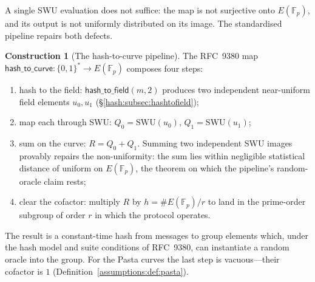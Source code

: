 \documentclass[11pt,a4paper]{article}
\theoremstyle{definition}
\newtheorem{construction}[theorem]{Construction}
\theoremstyle{remark}
\newcommand{\Fp}{\ensuremath{\mathbb{F}_{p}}}
\begin{document}
A single SWU evaluation does not suffice: the map is not surjective
onto \(E(\Fp)\), and its output is not uniformly distributed on its
image. The standardised pipeline repairs both defects.

\begin{construction}[The hash-to-curve pipeline]\label{hash:con:h2c}
The RFC~9380 map
\(\mathsf{hash\_to\_curve} \colon \allowbreak \{0,1\}^{*} \to E(\Fp)\) composes
four steps:
\begin{enumerate}
\item hash to the field: \(\mathsf{hash\_to\_field}(m, 2)\) produces
  two independent near-uniform field elements \(u_{0}, u_{1}\)
  (\S\ref{hash:subsec:hashtofield});
\item map each through SWU: \(Q_{0} = \mathrm{SWU}(u_{0})\),
  \(Q_{1} = \mathrm{SWU}(u_{1})\);
\item sum on the curve: \(R = Q_{0} + Q_{1}\). Summing two
  independent SWU images provably repairs the non-uniformity: the sum
  lies within negligible statistical distance of uniform on
  \(E(\Fp)\), the theorem on which the pipeline's random-oracle
  claim rests;
\item clear the cofactor: multiply \(R\) by \(h = \#E(\Fp)/r\) to land
  in the prime-order subgroup of order \(r\) in which the protocol
  operates.
\end{enumerate}
The result is a constant-time hash from messages to group elements
which, under the hash model and suite conditions of RFC~9380, can
instantiate a random oracle into the group. For the Pasta curves the
last step is vacuous---their
cofactor is \(1\) (Definition~\ref{assumptions:def:pasta}).
\end{construction}
\end{document}
